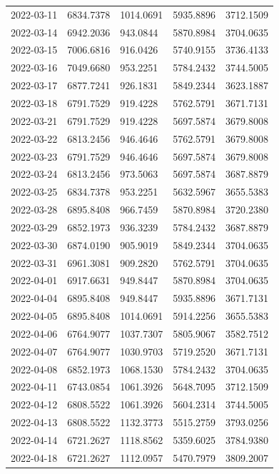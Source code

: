 \begin{footnotesize}
\begin{longtable}{lllll}
2022-03-11 & 6834.7378 & 1014.0691 & 5935.8896 & 3712.1509 \\
2022-03-14 & 6942.2036 & 943.0844 & 5870.8984 & 3704.0635 \\
2022-03-15 & 7006.6816 & 916.0426 & 5740.9155 & 3736.4133 \\
2022-03-16 & 7049.6680 & 953.2251 & 5784.2432 & 3744.5005 \\
2022-03-17 & 6877.7241 & 926.1831 & 5849.2344 & 3623.1887 \\
2022-03-18 & 6791.7529 & 919.4228 & 5762.5791 & 3671.7131 \\
2022-03-21 & 6791.7529 & 919.4228 & 5697.5874 & 3679.8008 \\
2022-03-22 & 6813.2456 & 946.4646 & 5762.5791 & 3679.8008 \\
2022-03-23 & 6791.7529 & 946.4646 & 5697.5874 & 3679.8008 \\
2022-03-24 & 6813.2456 & 973.5063 & 5697.5874 & 3687.8879 \\
2022-03-25 & 6834.7378 & 953.2251 & 5632.5967 & 3655.5383 \\
2022-03-28 & 6895.8408 & 966.7459 & 5870.8984 & 3720.2380 \\
2022-03-29 & 6852.1973 & 936.3239 & 5784.2432 & 3687.8879 \\
2022-03-30 & 6874.0190 & 905.9019 & 5849.2344 & 3704.0635 \\
2022-03-31 & 6961.3081 & 909.2820 & 5762.5791 & 3704.0635 \\
2022-04-01 & 6917.6631 & 949.8447 & 5870.8984 & 3704.0635 \\
2022-04-04 & 6895.8408 & 949.8447 & 5935.8896 & 3671.7131 \\
2022-04-05 & 6895.8408 & 1014.0691 & 5914.2256 & 3655.5383 \\
2022-04-06 & 6764.9077 & 1037.7307 & 5805.9067 & 3582.7512 \\
2022-04-07 & 6764.9077 & 1030.9703 & 5719.2520 & 3671.7131 \\
2022-04-08 & 6852.1973 & 1068.1530 & 5784.2432 & 3704.0635 \\
2022-04-11 & 6743.0854 & 1061.3926 & 5648.7095 & 3712.1509 \\
2022-04-12 & 6808.5522 & 1061.3926 & 5604.2314 & 3744.5005 \\
2022-04-13 & 6808.5522 & 1132.3773 & 5515.2759 & 3793.0256 \\
2022-04-14 & 6721.2627 & 1118.8562 & 5359.6025 & 3784.9380 \\
2022-04-18 & 6721.2627 & 1112.0957 & 5470.7979 & 3809.2007 \\

\end{longtable}
\end{footnotesize}
